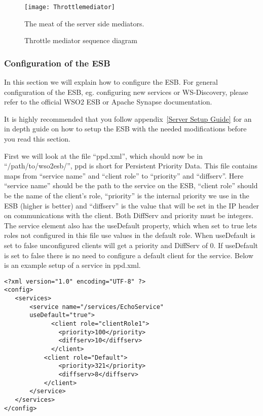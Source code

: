         \begin{figure}[H] 
            \centering
            \texttt{[image: Throttlemediator]}
            \caption{Throttle mediator sequence diagram}
            The meat of the server side mediators.
            \label{fig:Throttlemediator}
        \end{figure}
        

    \subsubsection{Configuration of the ESB}\label{Configuration of the ESB} 
	In this section we will explain how to configure the ESB. For general configuration of the ESB, eg. configuring new services or WS-Discovery, please refer to the official WSO2 ESB or Apache Synapse documentation.

	\begin{shaded}
	It is highly recommended that you follow appendix~\ref{Server Setup Guide} for an in depth guide on how to setup the ESB with the needed modifications before you read this section.
	\end{shaded}

	First we will look at the file “ppd.xml”, which should now be in “/path/to/wso2esb/”, ppd is short for Persistent Priority Data. This file contains maps from “service name” and “client role” to “priority” and “diffserv”. Here “service name” should be the path to the service on the ESB, “client role” should be the name of the client’s role, “priority” is the internal priority we use in the ESB (higher is better) and “diffserv” is the value that will be set in the IP header on communications with the client. Both DiffServ and priority must be integers.
	The service element also has the useDefault property, which when set to true lets roles not configured in this file use values in the default role. When useDefault is set to false unconfigured clients will get a priority and DiffServ of 0. If useDefault is set to false there is no need to configure a default client for the service.
	Below is an example setup of a service in ppd.xml.\\

\lstset{language=XML, style=eclipse}
\lstset{showstringspaces=false}
\begin{lstlisting}[frame=single, caption={ms.xml}, label=ms listing, breaklines=true] %Ok to not have this referenced =)
<?xml version="1.0" encoding="UTF-8" ?>
<config>
   <services>
	   <service name="/services/EchoService" 
	   useDefault="true">
	         <client role="clientRole1">
	           <priority>100</priority>
	           <diffserv>10</diffserv>
	         </client>
	       <client role="Default">
	           <priority>321</priority>
	           <diffserv>8</diffserv>
	       </client>
	   </service>
   </services>
</config>
\end{lstlisting}

